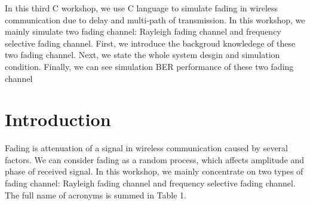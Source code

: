 \documentclass[technicalreport]{ieicej}
\begin{document}
\begin{eabstract}
In this third C workshop, we use C language to simulate fading in wireless communication due to delay and multi-path of transmission. In this workshop, we mainly simulate two fading channel: Rayleigh fading channel and frequency selective fading channel. First, we introduce the backgroud knowledege of these two fading channel. Next, we state the whole system desgin and simulation condition. Finally, we can see simulation BER performance of these two fading channel
\end{eabstract}

\maketitle

\section{Introduction}
Fading is attenuation of a signal in wireless communication caused by several factors. We can consider fading as a random process, which affects amplitude and phase of received signal. In this workshop, we mainly concentrate on two types of fading channel: Rayleigh fading channel and frequency selective fading channel. The full name of acronyms is summed in Table 1.\par
\end{document}
